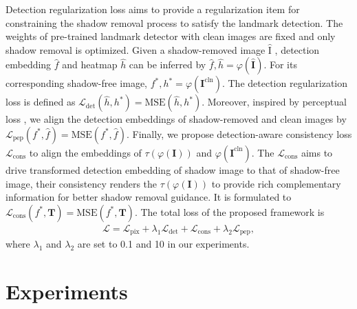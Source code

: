 \documentclass[10pt,twocolumn,letterpaper]{article}
\begin{document}
Detection regularization loss aims to provide a regularization item for constraining the shadow removal process to satisfy the landmark detection. The weights of pre-trained landmark detector with clean images are fixed and only shadow removal is optimized. 
%
Given a shadow-removed image $\hat{\text{I}}$ , detection embedding $\hat{f}$ and heatmap $\hat{h}$ can be inferred by 
$\hat{f}, \hat{h} =\varphi(\hat{\mathbf{I}})$. For its corresponding shadow-free image, 
$f^{*}, h^{*}=\varphi(\mathbf{I}^\text{cln})$. The detection regularization loss is defined as 
$
\mathcal{L}_\mathrm{det}(\hat{h}, h^*) = \mathrm{MSE}(\hat{h}, h^*).
$
 Moreover, inspired by perceptual loss \cite{johnson2016perceptual}, we align the detection embeddings of shadow-removed and clean images by 
$
\mathcal{L}_\mathrm{pep}(f^\text{*}, \hat{f}) = \mathrm{MSE}(f^{*}, \hat{f}).
$
 Finally, we propose detection-aware consistency loss $\mathcal{L}_\mathrm{cons}$ to align the embeddings of $\tau(\varphi(\mathbf{I}))$ and $\varphi(\mathbf{I}^\text{cln})$. 
The $\mathcal{L}_\mathrm{cons}$ aims to drive transformed detection embedding of shadow image to that of shadow-free image, their consistency renders the $\tau(\varphi(\mathbf{I}))$ to provide rich complementary information for better shadow removal guidance. It is formulated to $\mathcal{L}_\mathrm{cons}(f^\text{*}, \mathbf{T}) = \text{MSE}(f^\text{*},\mathbf{T})$. The total loss of the proposed framework is
%
\begin{align}
\mathcal{L}= \mathcal{L}_\mathrm{pix} + \lambda_{1}\mathcal{L}_\mathrm{det} + \mathcal{L}_\mathrm{cons} + \lambda_{2} \mathcal{L}_\mathrm{pep},
\end{align}
%
where $\lambda_1$ and $\lambda_2$ are set to 0.1 and 10 in our experiments.

\section{Experiments}

\end{document}
